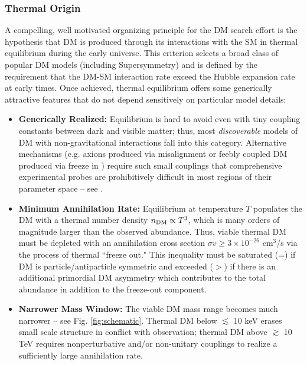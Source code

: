 \subsubsection{Thermal Origin}
A compelling, well motivated organizing principle for the DM search effort is the hypothesis that DM
is produced through its interactions with the SM in thermal equilibrium during the early universe. This criterion
selects a broad class of popular DM models (including Supersymmetry) and is defined by the requirement that the DM-SM 
interaction rate exceed the Hubble expansion rate at early times.  
Once achieved, thermal equilibrium offers some generically attractive features that do not depend sensitively
on particular model details:
\begin{itemize}
\item {\bf Generically Realized:} Equilibrium is hard to avoid even with tiny coupling constants  between 
dark and visible matter; thus, most {\it discoverable} models of DM with non-gravitational interactions fall into this category. 
Alternative mechanisms (e.g. axions produced via misalignment \cite{Visinelli:2009zm} or feebly coupled DM produced via freeze in \cite{Hall:2009bx}) require such small couplings
that comprehensive experimental probes are prohibitively difficult in most regions of their parameter space -- see \cite{Essig:2013lka}.
\item {\bf Minimum Annihilation Rate:}  Equilibrium at temperature $T$ populates the DM with a  thermal number density $n_{\rm DM} \propto T^3$, which is many orders of magnitude larger than the observed abundance. Thus, viable thermal DM must be depleted with an annihilation cross section $\sigma v \ge 3\times10^{-26}$ cm$^3$/s via
the process of thermal ``freeze out." This inequality must be saturated (=) if DM is particle/antiparticle symmetric and exceeded ($>$)  if there is an additional primordial DM asymmetry which contributes to the total abundance in addition to the freeze-out component.

\item {\bf Narrower Mass Window: }The viable DM mass range becomes much narrower -- see Fig. \ref{fig:schematic}.
Thermal DM below $\lesssim$ 10 keV erases small scale structure in conflict with observation; 
thermal DM above $\gtrsim$ 10 TeV requires nonperturbative and/or non-unitary couplings to realize
a sufficiently large annihilation rate. 
\end{itemize}

